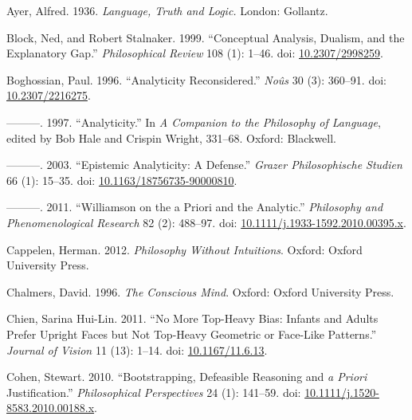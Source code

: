 \documentclass[
  10pt,
  letterpaper,
  DIV=11,
  numbers=noendperiod,
  twoside]{scrartcl}
\newlength{\cslhangindent}
\newenvironment{CSLReferences}[2] %
 {\begin{list}{}{%
  \setlength{\itemindent}{0pt}
  \setlength{\leftmargin}{0pt}
  \setlength{\parsep}{0pt}
  \ifodd #1
   \setlength{\leftmargin}{\cslhangindent}
   \setlength{\itemindent}{-1\cslhangindent}
  \fi
  \setlength{\itemsep}{#2\baselineskip}}}
 {\end{list}}
\begin{document}
\label{refs}
\begin{CSLReferences}{1}{0}
Ayer, Alfred. 1936. \emph{Language, Truth and Logic.} London: Gollantz.

Block, Ned, and Robert Stalnaker. 1999. {``{Conceptual Analysis,
Dualism, and the Explanatory Gap}.''} \emph{Philosophical Review} 108
(1): 1--46. doi:
\href{https://doi.org/10.2307/2998259}{10.2307/2998259}.

Boghossian, Paul. 1996. {``Analyticity Reconsidered.''} \emph{No{û}s} 30
(3): 360--91. doi:
\href{https://doi.org/10.2307/2216275}{10.2307/2216275}.

---------. 1997. {``Analyticity.''} In \emph{A Companion to the
Philosophy of Language}, edited by Bob Hale and Crispin Wright, 331--68.
Oxford: Blackwell.

---------. 2003. {``Epistemic Analyticity: A Defense.''} \emph{Grazer
Philosophische Studien} 66 (1): 15--35. doi:
\href{https://doi.org/10.1163/18756735-90000810}{10.1163/18756735-90000810}.

---------. 2011. {``Williamson on the a Priori and the Analytic.''}
\emph{Philosophy and Phenomenological Research} 82 (2): 488--97. doi:
\href{https://doi.org/10.1111/j.1933-1592.2010.00395.x}{10.1111/j.1933-1592.2010.00395.x}.

Cappelen, Herman. 2012. \emph{Philosophy Without Intuitions}. Oxford:
Oxford University Press.

Chalmers, David. 1996. \emph{The Conscious Mind}. Oxford: Oxford
University Press.

Chien, Sarina Hui-Lin. 2011. {``No More Top-Heavy Bias: Infants and
Adults Prefer Upright Faces but Not Top-Heavy Geometric or Face-Like
Patterns.''} \emph{Journal of Vision} 11 (13): 1--14. doi:
\href{https://doi.org/10.1167/11.6.13}{10.1167/11.6.13}.

Cohen, Stewart. 2010. {``Bootstrapping, Defeasible Reasoning and \emph{a
Priori} Justification.''} \emph{Philosophical Perspectives} 24 (1):
141--59. doi:
\href{https://doi.org/10.1111/j.1520-8583.2010.00188.x}{10.1111/j.1520-8583.2010.00188.x}.


\end{CSLReferences}
\end{document}
